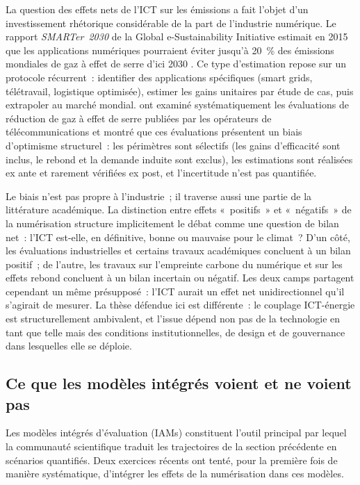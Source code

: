 La question des effets nets de l'ICT sur les émissions a fait l'objet d'un investissement rhétorique considérable de la part de l'industrie numérique. Le rapport \emph{SMARTer~2030} de la Global e-Sustainability Initiative estimait en 2015 que les applications numériques pourraient éviter jusqu'à 20~\% des émissions mondiales de gaz à effet de serre d'ici 2030 \parencite{gesi_smarter_2015}. Ce type d'estimation repose sur un protocole récurrent~: identifier des applications spécifiques (smart grids, télétravail, logistique optimisée), estimer les gains unitaires par étude de cas, puis extrapoler au marché mondial. \textcite{bieser_ghg_2024} ont examiné systématiquement les évaluations de réduction de gaz à effet de serre publiées par les opérateurs de télécommunications et montré que ces évaluations présentent un biais d'optimisme structurel~: les périmètres sont sélectifs (les gains d'efficacité sont inclus, le rebond et la demande induite sont exclus), les estimations sont réalisées ex ante et rarement vérifiées ex post, et l'incertitude n'est pas quantifiée.

Le biais n'est pas propre à l'industrie~; il traverse aussi une partie de la littérature académique. La distinction entre effets «~positifs~» et «~négatifs~» de la numérisation structure implicitement le débat comme une question de bilan net~: l'ICT est-elle, en définitive, bonne ou mauvaise pour le climat~? D'un côté, les évaluations industrielles et certains travaux académiques concluent à un bilan positif~; de l'autre, les travaux sur l'empreinte carbone du numérique \parencite{freitag_real_2021} et sur les effets rebond \parencite{lange_digitalization_2020} concluent à un bilan incertain ou négatif. Les deux camps partagent cependant un même présupposé~: l'ICT aurait un effet net unidirectionnel qu'il s'agirait de mesurer. La thèse défendue ici est différente~: le couplage ICT-énergie est structurellement ambivalent, et l'issue dépend non pas de la technologie en tant que telle mais des conditions institutionnelles, de design et de gouvernance dans lesquelles elle se déploie.


\subsection{Ce que les modèles intégrés voient et ne voient pas}\label{subsec:modeles}

Les modèles intégrés d'évaluation (IAMs) constituent l'outil principal par lequel la communauté scientifique traduit les trajectoires de la section précédente en scénarios quantifiés. Deux exercices récents ont tenté, pour la première fois de manière systématique, d'intégrer les effets de la numérisation dans ces modèles.

